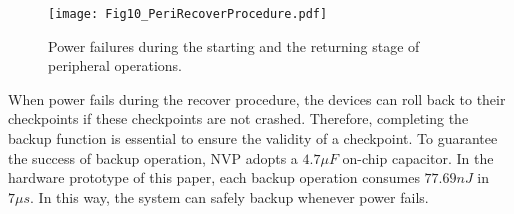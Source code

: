 %
\begin{figure}[t]
    \centering
    \texttt{[image: Fig10\_PeriRecoverProcedure.pdf]}
    \caption{Power failures during the starting and the returning stage of peripheral operations.}
    \label{fig:PeriRecoverProcedure}
\end{figure}

When power fails during the recover procedure, the devices can roll back to their checkpoints if these checkpoints are not crashed.
Therefore, completing the backup function is essential to ensure the validity of a checkpoint.
To guarantee the success of backup operation, NVP adopts a $4.7 \mu F$ on-chip capacitor.
In the hardware prototype of this paper, each backup operation consumes $77.69nJ$ in $7 \mu s$.
In this way, the system can safely backup whenever power fails.
